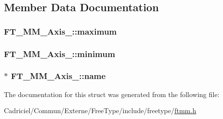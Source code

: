 \subsection{Member Data Documentation}
\hypertarget{struct_f_t___m_m___axis___addac1f8e71da1bedea9b393ae2751881}{
\subsubsection[{maximum}]{ F\-T\-\_\-\-M\-M\-\_\-\-Axis\-\_\-\-::maximum}}\label{struct_f_t___m_m___axis___addac1f8e71da1bedea9b393ae2751881}
\hypertarget{struct_f_t___m_m___axis___a9dc31f02b350b1356e0896673b5b73a4}{
\subsubsection[{minimum}]{ F\-T\-\_\-\-M\-M\-\_\-\-Axis\-\_\-\-::minimum}}\label{struct_f_t___m_m___axis___a9dc31f02b350b1356e0896673b5b73a4}
\hypertarget{struct_f_t___m_m___axis___a5c784efa44906c0e2b715eb1f866a09f}{
\subsubsection[{name}]{$\ast$ F\-T\-\_\-\-M\-M\-\_\-\-Axis\-\_\-\-::name}}\label{struct_f_t___m_m___axis___a5c784efa44906c0e2b715eb1f866a09f}


The documentation for this struct was generated from the following file\-:\begin{DoxyCompactItemize}
\item 
Cadriciel/\-Commun/\-Externe/\-Free\-Type/include/freetype/\hyperlink{ftmm_8h}{ftmm.\-h}\end{DoxyCompactItemize}
